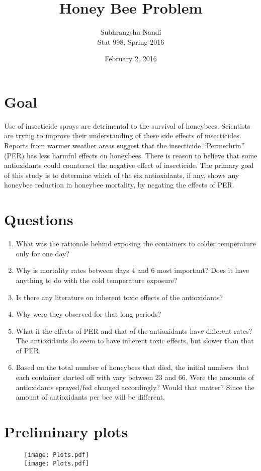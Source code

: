 \documentclass[11pt,a4paper]{article}
\begin{document}
\title{Honey Bee Problem}
\author{Subhrangshu Nandi\\
  Stat 998; Spring 2016}
\date{February 2, 2016}

\maketitle

\section*{Goal}
Use of insecticide sprays are detrimental to the survival of honeybees. Scientists are trying to improve their understanding of these side effects of insecticides. Reports from warmer weather areas suggest that the insecticide ``Permethrin'' (PER) has less harmful effects on honeybees. There is reason to believe that some antioxidants could counteract the negative effect of insecticide. The primary goal of this study is to determine which of the six antioxidants, if any, shows any honeybee reduction in honeybee mortality, by negating the effects of PER. 

\section*{Questions}
\begin{enumerate}
\item What was the rationale behind exposing the containers to colder temperature only for one day?
\item Why is mortality rates between days 4 and 6 most important? Does it have anything to do with the cold temperature exposure?
\item Is there any literature on inherent toxic effects of the antioxidants?
\item Why were they observed for that long periods?
\item What if the effects of PER and that of the antioxidants have different rates? The antioxidants do seem to have inherent toxic effects, but slower than that of PER.
\item Based on the total number of honeybees that died, the initial numbers that each container started off with vary between 23 and 66. Were the amounts of antioxidants sprayed/fed changed accordingly? Would that matter? Since the amount of antioxidants per bee will be different.
\end{enumerate}

\section*{Preliminary plots}
\begin{figure}[H]
\begin{center}
\texttt{[image: Plots.pdf]}\\
\texttt{[image: Plots.pdf]}
\end{center}
\end{figure}
\end{document}
